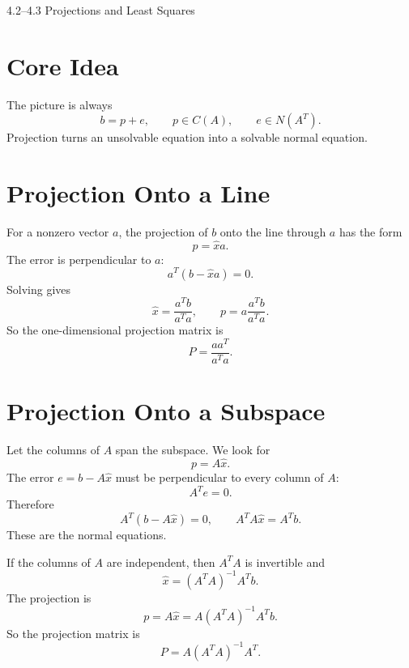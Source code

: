 \documentclass[10pt]{article}
\begin{document}
\begin{center}
{\LARGE 4.2--4.3 Projections and Least Squares\par}
\end{center}

\section{Core Idea}


The picture is always
\[
b=p+e,
\qquad
p\in C(A),
\qquad
e\in N(A^{T}).
\]
Projection turns an unsolvable equation into a solvable normal equation.

\section{Projection Onto a Line}

For a nonzero vector \(a\), the projection of \(b\) onto the line through \(a\) has the form
\[
p=\hat{x}a.
\]
The error is perpendicular to \(a\):
\[
a^{T}(b-\hat{x}a)=0.
\]
Solving gives
\[
\hat{x}=\frac{a^{T}b}{a^{T}a},
\qquad
p=a\frac{a^{T}b}{a^{T}a}.
\]
So the one-dimensional projection matrix is
\[
P=\frac{aa^{T}}{a^{T}a}.
\]


\section{Projection Onto a Subspace}

Let the columns of \(A\) span the subspace. We look for
\[
p=A\hat{x}.
\]
The error \(e=b-A\hat{x}\) must be perpendicular to every column of \(A\):
\[
A^{T}e=0.
\]
Therefore
\[
A^{T}(b-A\hat{x})=0,
\qquad
A^{T}A\hat{x}=A^{T}b.
\]
These are the normal equations.

If the columns of \(A\) are independent, then \(A^{T}A\) is invertible and
\[
\hat{x}=(A^{T}A)^{-1}A^{T}b.
\]
The projection is
\[
p=A\hat{x}=A(A^{T}A)^{-1}A^{T}b.
\]
So the projection matrix is
\[
P=A(A^{T}A)^{-1}A^{T}.
\]
\end{document}
